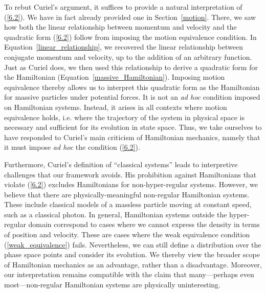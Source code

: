 \documentclass[12pt, english, twoside]{article} %
\begin{document}
To rebut Curiel's argument, it suffices to provide a natural interpretation of (\ref{6.2}). We have in fact already provided one in Section~\ref{motion}. There, we saw how both the linear relationship between momentum and velocity and the quadratic form (\ref{6.2}) follow from imposing the motion equivalence condition. In Equation~\ref{linear_relationship}, we recovered the linear relationship between conjugate momentum and velocity, up to the addition of an arbitrary function. Just as Curiel does, we then used this relationship to derive a quadratic form for the Hamiltonian (Equation~\ref{massive_Hamiltonian}). Imposing motion equivalence thereby allows us to interpret this quadratic form as the Hamiltonian for massive particles under potential forces. It is not an \textit{ad hoc} condition imposed on Hamiltonian systems. Instead, it arises in all contexts where motion equivalence holds, i.e. where the trajectory of the system in physical space is necessary and sufficient for its evolution in state space. Thus, we take ourselves to have responded to Curiel's main criticism of Hamiltonian mechanics, namely that it must impose \textit{ad hoc} the condition (\ref{6.2}). 

Furthermore, Curiel's definition of ``classical systems'' leads to interpretive challenges that our framework avoids. His prohibition against Hamiltonians that violate (\ref{6.2}) excludes Hamiltonians for non-hyper-regular systems. However, we believe that there are physically-meaningful non-regular Hamiltonian systems. These include classical models of a massless particle moving at constant speed, such as a classical photon. In general, Hamiltonian systems outside the hyper-regular domain correspond to cases where we cannot express the density in terms of position and velocity. These are cases where the weak equivalence condition (\ref{weak_equivalence}) fails. Nevertheless, we can still define a distribution over the phase space points and consider its evolution. We thereby view the broader scope of Hamiltonian mechanics as an advantage, rather than a disadvantage. Moreover, our interpretation remains compatible with the claim that many---perhaps even most---non-regular Hamiltonian systems are physically uninteresting.
\end{document}
